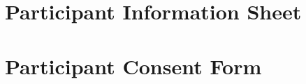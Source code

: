 \documentclass[12pt,a4paper,twoside,openright]{book}
\begin{document}
\chapter{Participant Information Sheet}
\label{appendix_participant_info_sheet}
\newpage
{}
\chapter{Participant Consent Form}
\end{document}
